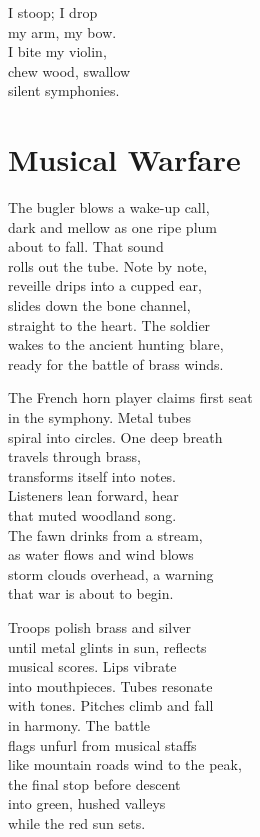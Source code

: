 \documentclass[twoside,10pt]{book}
\begin{document}
I stoop; I drop\\
my arm, my bow.\\
I bite my violin,\\
chew wood, swallow\\
silent symphonies.


\clearpage
\section{Musical Warfare}

The bugler blows a wake-up call,\\
dark and mellow as one ripe plum\\
about to fall. That sound\\
rolls out the tube. Note by note,\\
reveille drips into a cupped ear,\\
slides down the bone channel,\\
straight to the heart. The soldier\\
wakes to the ancient hunting blare,\\
ready for the battle of brass winds.

The French horn player claims first seat\\
in the symphony. Metal tubes\\
spiral into circles. One deep breath\\
travels through brass,\\
transforms itself into notes.\\
Listeners lean forward, hear\\
that muted woodland song.\\
The fawn drinks from a stream,\\
as water flows and wind blows\\
storm clouds overhead, a warning\\
that war is about to begin.

Troops polish brass and silver\\
until metal glints in sun, reflects\\
musical scores. Lips vibrate\\
into mouthpieces. Tubes resonate\\
with tones. Pitches climb and fall\\
in harmony. The battle\\
flags unfurl from musical staffs\\
like mountain roads wind to the peak,\\
the final stop before descent\\
into green, hushed valleys\\
while the red sun sets.
\end{document}
